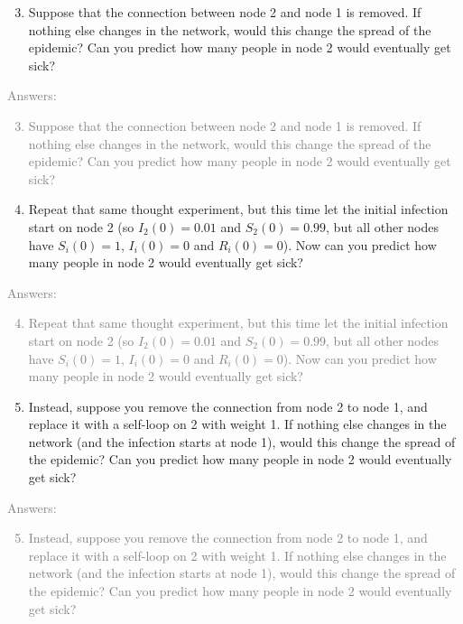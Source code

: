 \documentclass[11pt]{article}
\begin{document}
\begin{enumerate}
	\setcounter{enumi}{2}
	\item Suppose that the connection between node 2 and node 1 is removed. If nothing else changes in the network, would this change the spread of the epidemic? Can you predict how many people in node 2 would eventually get sick?
\end{enumerate}
\textcolor{gray}{
Answers:
\begin{enumerate}
	\setcounter{enumi}{2}
	\item Suppose that the connection between node 2 and node 1 is removed. If nothing else changes in the network, would this change the spread of the epidemic? Can you predict how many people in node 2 would eventually get sick?
\end{enumerate}
}

\begin{enumerate}
	\setcounter{enumi}{3}
	\item Repeat that same thought experiment, but this time let the initial infection start on node 2 (so $I_2(0) = 0.01$ and $S_2(0) = 0.99$, but all other nodes have $S_i(0)=1$, $I_i(0)=0$  and $R_i(0)=0$). Now can you predict how many people in node 2 would eventually get sick?
\end{enumerate}
\textcolor{gray}{
Answers:
\begin{enumerate}
	\setcounter{enumi}{3}
	\item Repeat that same thought experiment, but this time let the initial infection start on node 2 (so $I_2(0) = 0.01$ and $S_2(0) = 0.99$, but all other nodes have $S_i(0)=1$, $I_i(0)=0$  and $R_i(0)=0$). Now can you predict how many people in node 2 would eventually get sick?
\end{enumerate}
}

\begin{enumerate}
	\setcounter{enumi}{4}
	\item Instead, suppose you remove the connection from node 2 to node 1, and replace it with a self-loop on 2 with weight 1. If nothing else changes in the network (and the infection starts at node 1), would this change the spread of the epidemic? Can you predict how many people in node 2 would eventually get sick?
\end{enumerate}
\textcolor{gray}{
Answers:
\begin{enumerate}
	\setcounter{enumi}{4}
	\item Instead, suppose you remove the connection from node 2 to node 1, and replace it with a self-loop on 2 with weight 1. If nothing else changes in the network (and the infection starts at node 1), would this change the spread of the epidemic? Can you predict how many people in node 2 would eventually get sick?
\end{enumerate}
}
\end{document}
